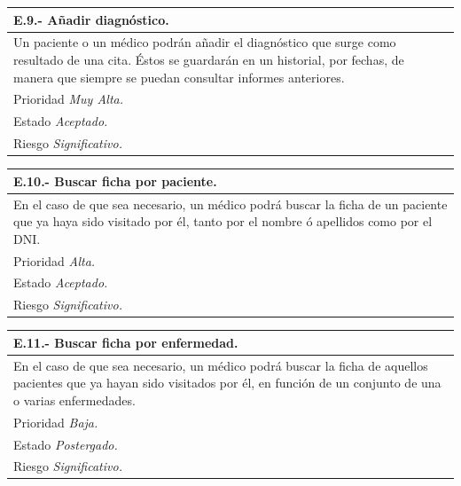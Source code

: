 \documentclass[a4paper,oneside,11pt]{book}
\begin{document}
\begin{center}
\begin{tabulary}{15cm}{|L|}
	\hline
		\bf{E.9.- Añadir diagnóstico.} \\
	\hline
		Un paciente o un médico podrán añadir el diagnóstico que surge como resultado de una cita. Éstos se guardarán en un historial, por fechas, de manera que siempre se puedan consultar informes anteriores. \\
	\hline
		Prioridad \textit{Muy Alta.} \\
	\hline
		Estado \textit{Aceptado.} \\
	\hline
		Riesgo \textit{Significativo.} \\
	\hline
\end{tabulary}
\end{center}

\begin{center}
\begin{tabulary}{15cm}{|L|}
	\hline
		\bf{E.10.- Buscar ficha por paciente.} \\
	\hline
		En el caso de que sea necesario, un médico podrá buscar la ficha de un paciente que ya haya sido visitado por él, tanto por el nombre ó apellidos como por el DNI. \\
	\hline
		Prioridad \textit{Alta.} \\
	\hline
		Estado \textit{Aceptado.} \\
	\hline
		Riesgo \textit{Significativo.} \\
	\hline
\end{tabulary}
\end{center}

\begin{center}
\begin{tabulary}{15cm}{|L|}
	\hline
		\bf{E.11.- Buscar ficha por enfermedad.} \\
	\hline
		En el caso de que sea necesario, un médico podrá buscar la ficha de aquellos pacientes que ya hayan sido visitados por él, en función de un conjunto de una o varias enfermedades. \\
	\hline
		Prioridad \textit{Baja.} \\
	\hline
		Estado \textit{Postergado.} \\
	\hline
		Riesgo \textit{Significativo.} \\
	\hline
\end{tabulary}
\end{center}
\end{document}
